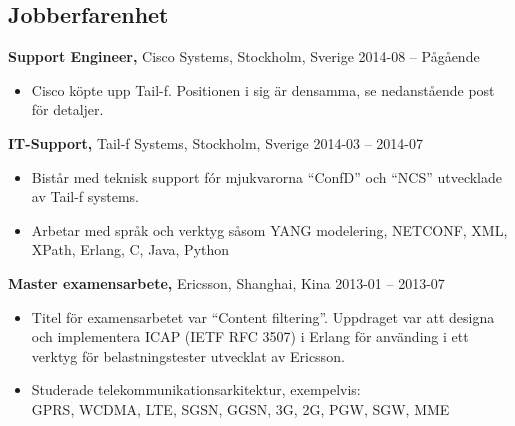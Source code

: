 \documentclass[margin]{res}
\begin{document}

\address{{\bf Kontaktinformation}\\

linkedin.com/in/tommymattsson\\
github.com/Taddic\\
}

\address{{\bf Adress}\\
  \\
}

\begin{resume}

\section{Jobberfarenhet}
{\bf Support Engineer,} Cisco Systems, Stockholm, Sverige \hfill 2014-08 -- Pågående
 \begin{itemize} \itemsep -2pt  %
 \item Cisco köpte upp Tail-f. Positionen i sig är densamma, se
   nedanstående post för detaljer.
 \end{itemize}

{\bf IT-Support,} Tail-f Systems, Stockholm, Sverige \hfill 2014-03 -- 2014-07
 \begin{itemize} \itemsep -2pt  %
 \item Bistår med teknisk support fór mjukvarorna ``ConfD'' och ``NCS''
   utvecklade av Tail-f systems.
 \item Arbetar med språk och verktyg såsom YANG modelering, NETCONF,
   XML, XPath, Erlang, C, Java, Python
 \end{itemize}

{\bf Master examensarbete,} Ericsson, Shanghai, Kina \hfill 2013-01 -- 2013-07
 \begin{itemize} \itemsep -2pt  %
 \item Titel för examensarbetet var ``Content filtering''. Uppdraget var
   att designa och implementera ICAP (IETF RFC 3507) i Erlang för
   använding i ett verktyg för belastningstester utvecklat av Ericsson.
 \item Studerade telekommunikationsarkitektur, exempelvis: \\
 GPRS, WCDMA, LTE, SGSN, GGSN, 3G, 2G, PGW, SGW, MME
 \end{itemize}


\end{resume}
\end{document}
